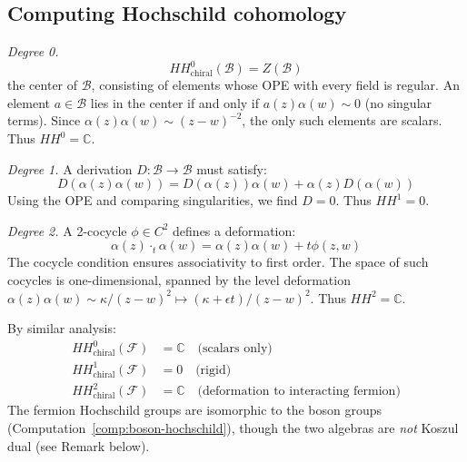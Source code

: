 \subsection{Computing Hochschild cohomology}

\begin{computation}
\label{comp:boson-hochschild}

\emph{Degree 0.}
\[
HH^0_{\text{chiral}}(\mathcal{B}) = Z(\mathcal{B})
\]
the center of $\mathcal{B}$, consisting of elements whose OPE with every field is regular.
An element $a \in \mathcal{B}$ lies in the center if and only if $a(z)\alpha(w) \sim 0$ (no singular terms).  Since $\alpha(z)\alpha(w) \sim (z-w)^{-2}$, the only such elements are scalars.  Thus $HH^0 = \mathbb{C}$.

\emph{Degree 1.}
A derivation $D: \mathcal{B} \to \mathcal{B}$ must satisfy:
\[
D(\alpha(z)\alpha(w)) = D(\alpha(z))\alpha(w) + \alpha(z)D(\alpha(w))
\]
Using the OPE and comparing singularities, we find $D = 0$. Thus $HH^1 = 0$.

\emph{Degree 2.}
A 2-cocycle $\phi \in C^2$ defines a deformation:
\[
\alpha(z) \cdot_t \alpha(w) = \alpha(z)\alpha(w) + t\phi(z,w)
\]
The cocycle condition ensures associativity to first order. The space of such cocycles
is one-dimensional, spanned by the level deformation $\alpha(z) \alpha(w) \sim \kappa/(z-w)^2 \mapsto (\kappa + \epsilon t)/(z-w)^2$.  Thus $HH^2 = \mathbb{C}$.
\end{computation}

\begin{computation}
\label{comp:fermion-hochschild}

By similar analysis:
\begin{align}
HH^0_{\text{chiral}}(\mathcal{F}) &= \mathbb{C} \quad \text{(scalars only)} \\
HH^1_{\text{chiral}}(\mathcal{F}) &= 0 \quad \text{(rigid)} \\
HH^2_{\text{chiral}}(\mathcal{F}) &= \mathbb{C} \quad \text{(deformation to interacting fermion)}
\end{align}
The fermion Hochschild groups are isomorphic to the boson groups (Computation~\ref{comp:boson-hochschild}), though the two algebras are \emph{not} Koszul dual (see Remark below).
\end{computation}

